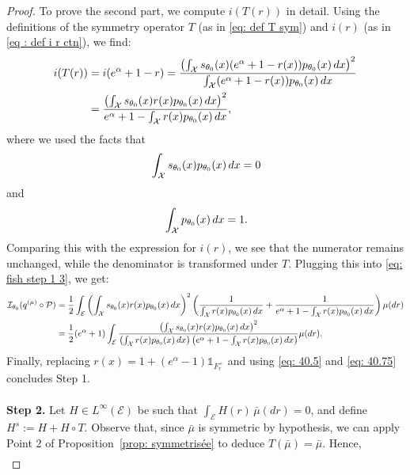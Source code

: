 \documentclass[a4paper, 11pt]{article}
\theoremstyle{definition}
\newcommand{\indi}[1]{\mathds{1}_{#1}}
\begin{document}
{\begin{proof}
To prove the second part, we compute $i(T(r))$ in detail. Using the definitions of the symmetry operator $T$ (as in \eqref{eq: def T sym}) and $i(r)$ (as in \eqref{eq : def i r ctn}), we find:
\begin{align}{\label{eq: i(T(r))}}
i(T(r)) &= i(e^\alpha + 1 - r) = \frac{\left( \int_\mathcal{X} s_{\theta_0}(x) (e^\alpha + 1 - r(x)) p_{\theta_0}(x) \, dx \right)^2}{\int_\mathcal{X} (e^\alpha + 1 - r(x)) p_{\theta_0}(x) \, dx} \\
&= \frac{\left( \int_\mathcal{X} s_{\theta_0}(x) r(x) p_{\theta_0}(x) \, dx \right)^2}{e^\alpha + 1 - \int_\mathcal{X} r(x) p_{\theta_0}(x) \, dx}, \nonumber
\end{align}
where we used the facts that 
\begin{equation}{\label{eq: 40.5}}
 \int_\mathcal{X} s_{\theta_0}(x) p_{\theta_0}(x) \, dx = 0   
\end{equation}
and 
\begin{equation}{\label{eq: 40.75}}
 \int_\mathcal{X} p_{\theta_0}(x) \, dx = 1.   
\end{equation}
Comparing this with the expression for $i(r)$, we see that the numerator remains unchanged, while the denominator is transformed under $T$. Plugging this into \eqref{eq: fish step 1 3}, we get:
\begin{align}{\label{eq: 40.9}}
\mathcal{I}_{\theta_0}(q^{(\mu)} \circ \mathcal{P}) &= \frac{1}{2} \int_\mathcal{E} \left( \int_\mathcal{X} s_{\theta_0}(x) r(x) p_{\theta_0}(x) \, dx \right)^2 \left( \frac{1}{\int_\mathcal{X} r(x) p_{\theta_0}(x) \, dx} + \frac{1}{e^\alpha + 1 - \int_\mathcal{X} r(x) p_{\theta_0}(x) \, dx} \right) \mu(dr) \nonumber \\
&= \frac{1}{2}(e^\alpha + 1) \int_\mathcal{E} \frac{\left( \int_\mathcal{X} s_{\theta_0}(x) r(x) p_{\theta_0}(x) \, dx \right)^2}{\left( \int_\mathcal{X} r(x) p_{\theta_0}(x) \, dx \right) \left( e^\alpha + 1 - \int_\mathcal{X} r(x) p_{\theta_0}(x) \, dx \right)} \mu(dr).
\end{align}
Finally, replacing $r(x) = 1 + (e^\alpha - 1) \indi{F_r^+}$ and using \eqref{eq: 40.5} and \eqref{eq: 40.75} concludes Step 1. \\
\\
\textbf{Step 2.} Let $H \in L^\infty(\mathcal{E})$ be such that $\int_\mathcal{E} H(r)\, \bar{\mu}(dr) = 0$, and define $H^s := H + H \circ T$. Observe that, since $\bar{\mu}$ is symmetric by hypothesis, we can apply Point 2 of Proposition~\ref{prop: symmetrisée} to deduce $T(\bar{\mu}) = \bar{\mu}$. Hence,
\begin{align*}

\end{align*}
\end{proof}}
\end{document}
